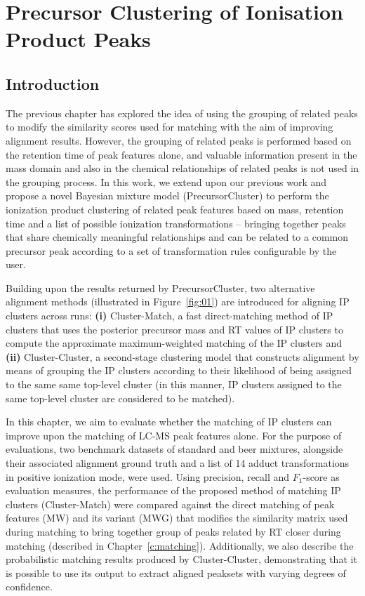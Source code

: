 \chapter{Precursor Clustering of Ionisation Product Peaks}
\label{c:background}

\section{Introduction}

The previous chapter has explored the idea of using the grouping of related peaks to modify the similarity scores  used for matching with the aim of improving alignment results. However, the grouping of related peaks is performed based on the retention time of peak features alone, and valuable information present in the mass domain and also in the chemical relationships of related peaks is not used in the grouping process. In this work, we extend upon our previous work and propose a novel Bayesian mixture model (PrecursorCluster) to perform the ionization product clustering of related peak features based on mass, retention time and a list of possible ionization transformations -- bringing together peaks that share chemically meaningful relationships and can be related to a common precursor peak according to a set of transformation rules configurable by the user. 

Building upon the results returned by PrecursorCluster, two alternative alignment methods (illustrated in Figure~\ref{fig:01}) are introduced for aligning IP clusters across runs: \textbf{(i)} Cluster-Match, a fast direct-matching method of IP clusters that uses the posterior precursor mass and RT values of IP clusters to compute the approximate maximum-weighted matching of the IP clusters and \textbf{(ii)} Cluster-Cluster, a second-stage clustering model that constructs alignment by means of grouping the IP clusters according to their likelihood of being assigned to the same same top-level cluster (in this manner, IP clusters assigned to the same top-level cluster are considered to be matched). 

In this chapter, we aim to evaluate whether the matching of IP clusters can improve upon the matching of LC-MS peak features alone. For the purpose of evaluations, two benchmark datasets of standard and beer mixtures, alongside their associated alignment ground truth and a list of 14 adduct transformations in positive ionization mode, were used. Using precision, recall and $F_1$-score as evaluation measures, the performance of the proposed method of matching IP clusters (Cluster-Match) were compared against the direct matching of peak features (MW) and its variant (MWG) that modifies the similarity matrix used during matching to bring together group of peaks related by RT closer during matching (described in Chapter~\ref{c:matching}). Additionally, we also describe the probabilistic matching results produced by Cluster-Cluster, demonstrating that it is possible to use its output to extract aligned peaksets with varying degrees of confidence.

